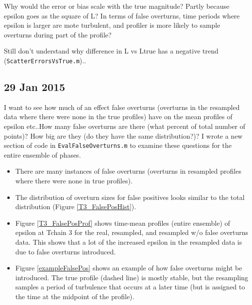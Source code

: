 \documentclass[11pt]{article}
\begin{document}
\vspace{1cm}

Why would the error or bias scale with the true magnitude? Partly because epsilon goes as the square of L? In terms of false overturns, time periods where epsilon is larger are mote turbulent, and profiler is more likely to sample overturns during part of the profile?

\vspace{1cm}

Still don't understand why difference in L vs Ltrue has a negative trend (\verb+ScatterErrorsVsTrue.m+).. 



\newpage
\subsection{29 Jan 2015}

I want to see how much of an effect false overturns (overturns in the resampled data where there were none in the true profiles) have on the mean profiles of epsilon etc..How many false overturns are there (what percent of total number of points)? How big are they (do they have the same distribution?)? I wrote a new section of code in \verb+EvalFalseOverturns.m+ to examine these questions for the entire ensemble of phases.

\begin{itemize}
\item There are many instances of false overturns (overturns in resampled profiles where there were none in true profiles).
\item The distribution of overturn sizes for false positives looks similar to the total distribution (Figure \ref{T3_FalsePosHist}).
\item Figure \ref{T3_FalsePosProf} shows time-mean profiles (entire ensemble) of epsilon at Tchain 3 for the real, resampled, and resampled w/o false overturns data. This shows that a lot of the increased epsilon in the resampled data is due to false overturns introduced. 
\item Figure \ref{exampleFalsePos} shows an example of how false overturns might be introduced. The true profile (dashed line) is mostly stable, but the resampling samples a period of turbulence that occurs at a later time (but is assigned to the time at the midpoint of the profile). 
\end{itemize}
\end{document}
